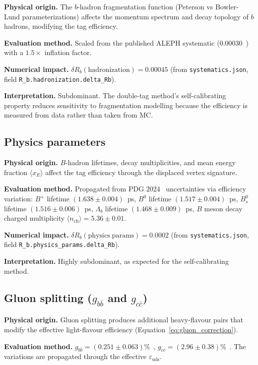 \documentclass[11pt,a4paper]{article}
\begin{document}
\textbf{Physical origin.} The $b$-hadron fragmentation function (Peterson vs Bowler-Lund
parameterizations) affects the momentum spectrum and decay topology of $b$ hadrons,
modifying the tag efficiency.

\textbf{Evaluation method.} Scaled from the published ALEPH systematic
(0.00030~\cite{ALEPH:Rb:1996}) with a $1.5\times$ inflation factor.

\textbf{Numerical impact.}
$\delta R_b(\mathrm{hadronization}) = 0.00045$
(from \texttt{systematics.json}, field \texttt{R\_b.hadronization.delta\_Rb}).

\textbf{Interpretation.} Subdominant. The double-tag method's self-calibrating property
reduces sensitivity to fragmentation modelling because the efficiency is measured from
data rather than taken from MC.

\subsection{Physics parameters}
\label{sec:syst_physics}

\textbf{Physical origin.} $B$-hadron lifetimes, decay multiplicities, and mean energy
fraction $\langle x_E \rangle$ affect the tag efficiency through the displaced vertex
signature.

\textbf{Evaluation method.} Propagated from PDG 2024~\cite{PDG:2024} uncertainties
via efficiency variation:
$B^+$ lifetime $(1.638 \pm 0.004)$~ps,
$B^0$ lifetime $(1.517 \pm 0.004)$~ps,
$B_s^0$ lifetime $(1.516 \pm 0.006)$~ps,
$\Lambda_b$ lifetime $(1.468 \pm 0.009)$~ps,
$B$ meson decay charged multiplicity $\langle n_\mathrm{ch} \rangle = 5.36 \pm 0.01$.

\textbf{Numerical impact.}
$\delta R_b(\mathrm{physics\;params}) = 0.0002$
(from \texttt{systematics.json}, field \texttt{R\_b.physics\_params.delta\_Rb}).

\textbf{Interpretation.} Highly subdominant, as expected for the self-calibrating method.

\subsection{Gluon splitting ($g_{b\bar{b}}$ and $g_{c\bar{c}}$)}
\label{sec:syst_gluon}

\textbf{Physical origin.} Gluon splitting produces additional heavy-flavour pairs
that modify the effective light-flavour efficiency (Equation~\ref{eq:gluon_correction}).

\textbf{Evaluation method.}
$g_{b\bar{b}} = (0.251 \pm 0.063)\%$~\cite{LEP:HF:2001},
$g_{c\bar{c}} = (2.96 \pm 0.38)\%$~\cite{LEP:gcc}.
The variations are propagated through the effective $\varepsilon_\mathrm{uds}$.
\end{document}
